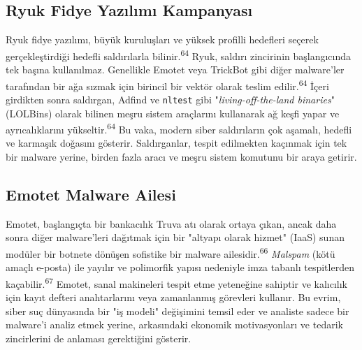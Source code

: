 \subsection{Ryuk Fidye Yazılımı Kampanyası}

Ryuk fidye yazılımı, büyük kuruluşları ve yüksek profilli hedefleri seçerek gerçekleştirdiği hedefli saldırılarla bilinir.\textsuperscript{64} Ryuk, saldırı zincirinin başlangıcında tek başına kullanılmaz. Genellikle Emotet veya TrickBot gibi diğer malware'ler tarafından bir ağa sızmak için birincil bir vektör olarak teslim edilir.\textsuperscript{64} İçeri girdikten sonra saldırgan, Adfind ve \texttt{nltest} gibi "\textit{living-off-the-land binaries}" (LOLBins) olarak bilinen meşru sistem araçlarını kullanarak ağ keşfi yapar ve ayrıcalıklarını yükseltir.\textsuperscript{64} Bu vaka, modern siber saldırıların çok aşamalı, hedefli ve karmaşık doğasını gösterir. Saldırganlar, tespit edilmekten kaçınmak için tek bir malware yerine, birden fazla aracı ve meşru sistem komutunu bir araya getirir.

\subsection{Emotet Malware Ailesi}

Emotet, başlangıçta bir bankacılık Truva atı olarak ortaya çıkan, ancak daha sonra diğer malware'leri dağıtmak için bir "altyapı olarak hizmet" (IaaS) sunan modüler bir botnete dönüşen sofistike bir malware ailesidir.\textsuperscript{66} \textit{Malspam} (kötü amaçlı e-posta) ile yayılır ve polimorfik yapısı nedeniyle imza tabanlı tespitlerden kaçabilir.\textsuperscript{67} Emotet, sanal makineleri tespit etme yeteneğine sahiptir ve kalıcılık için kayıt defteri anahtarlarını veya zamanlanmış görevleri kullanır. Bu evrim, siber suç dünyasında bir "iş modeli" değişimini temsil eder ve analiste sadece bir malware'i analiz etmek yerine, arkasındaki ekonomik motivasyonları ve tedarik zincirlerini de anlaması gerektiğini gösterir.
